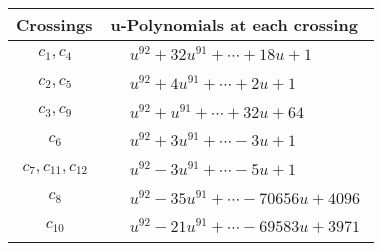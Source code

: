 \documentclass[1p]{elsarticle_modified}
\theoremstyle{definition}
\begin{document}
\begin{tabular}{m{50pt}|m{274pt}}
Crossings & \hspace{64pt}u-Polynomials at each crossing \\
\hline $$\begin{aligned}c_{1},c_{4}\end{aligned}$$&$\begin{aligned}
&u^{92}+32 u^{91}+\cdots+18 u+1
\end{aligned}$\\
\hline $$\begin{aligned}c_{2},c_{5}\end{aligned}$$&$\begin{aligned}
&u^{92}+4 u^{91}+\cdots+2 u+1
\end{aligned}$\\
\hline $$\begin{aligned}c_{3},c_{9}\end{aligned}$$&$\begin{aligned}
&u^{92}+u^{91}+\cdots+32 u+64
\end{aligned}$\\
\hline $$\begin{aligned}c_{6}\end{aligned}$$&$\begin{aligned}
&u^{92}+3 u^{91}+\cdots-3 u+1
\end{aligned}$\\
\hline $$\begin{aligned}c_{7},c_{11},c_{12}\end{aligned}$$&$\begin{aligned}
&u^{92}-3 u^{91}+\cdots-5 u+1
\end{aligned}$\\
\hline $$\begin{aligned}c_{8}\end{aligned}$$&$\begin{aligned}
&u^{92}-35 u^{91}+\cdots-70656 u+4096
\end{aligned}$\\
\hline $$\begin{aligned}c_{10}\end{aligned}$$&$\begin{aligned}
&u^{92}-21 u^{91}+\cdots-69583 u+3971
\end{aligned}$\\
\hline
\end{tabular}\\~\\
\newpage\renewcommand{\arraystretch}{1}
\end{document}
